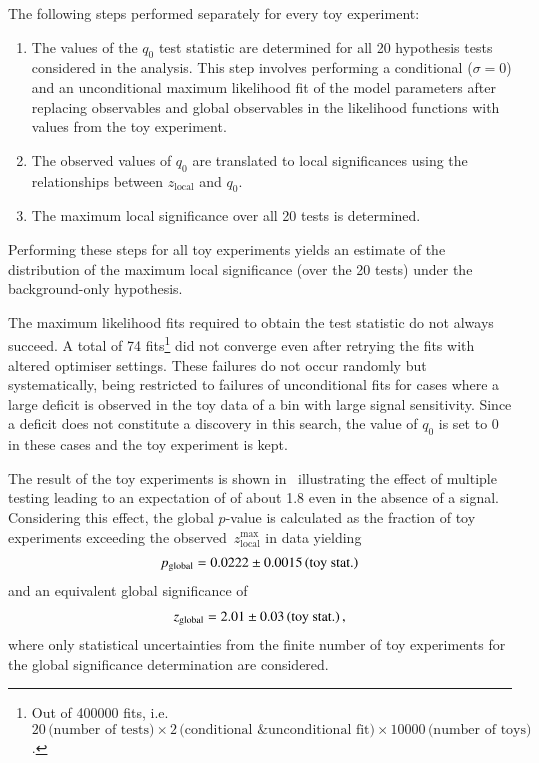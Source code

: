 The following steps performed separately for every toy experiment:
\begin{enumerate}

\item The values of the $q_0$ test statistic are determined for all 20
  hypothesis tests considered in the analysis. This step involves performing a
  conditional ($\sigma = 0$) and an unconditional maximum likelihood fit of the
  model parameters after replacing observables and global observables in the
  likelihood functions with values from the toy experiment.

\item The observed values of $q_0$ are translated to local significances using
  the relationships between $z_{\text{local}}$ and $q_0$.

\item The maximum local significance over all 20 tests is determined.

\end{enumerate}
Performing these steps for all toy experiments yields an estimate of the
distribution of the maximum local significance (over the 20 tests) under the
background-only hypothesis.

The maximum likelihood fits required to obtain the test statistic do not always
succeed. A total of \num{74} fits\footnote{Out of \num{400000} fits, i.e.\
  $20\,\text{(number of tests)} \times 2\,\text{(conditional \& unconditional
    fit)} \times \num{10000}\,\text{(number of toys)}$.}  did not converge even
after retrying the fits with altered optimiser settings. These failures do not
occur randomly but systematically, being restricted to failures of unconditional
fits for cases where a large deficit is observed in the toy data of a bin with
large signal sensitivity. Since a deficit does not constitute a discovery in
this search, the value of $q_0$ is set to 0 in these cases and the toy
experiment is kept.

The result of the toy experiments is shown in~ illustrating
the effect of multiple testing leading to an expectation of \Zmaxlocal of about
\num{1.8} even in the absence of a signal. Considering this effect, the global
$p$-value is calculated as the fraction of toy experiments exceeding the
observed~$z_{\text{local}}^{\text{max}}$ in data yielding
\begin{align*}
  \pglobal = \num{0.0222}\numerrt{0.0015}{toy stat.}
\end{align*}
and an equivalent global significance of
\begin{align*}
  z_{\text{global}} = \num{2.01}\numerrt{0.03}{toy stat.} \,\text{,}
\end{align*}
where only statistical uncertainties from the finite number of toy experiments
for the global significance determination are considered.

